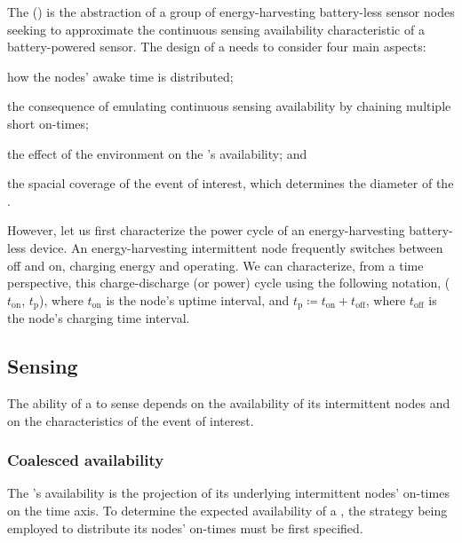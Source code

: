 The \fullcis (\cis) is the abstraction of a group of energy-harvesting battery-less sensor nodes seeking to approximate the continuous sensing availability characteristic of a battery-powered sensor. The design of a \cis needs to consider four main aspects: 
\begin{enumerate*}[label=(\roman*)]
\item how the nodes' awake time is distributed; 
\item the consequence of emulating continuous sensing availability by chaining multiple short on-times; 
\item the effect of the environment on the \cis's availability; and 
\item the spacial coverage of the event of interest, which determines the diameter of the \cis.
\end{enumerate*}

However, let us first characterize the power cycle of an energy-harvesting battery-less device. 
An energy-harvesting intermittent node frequently switches between off and on, charging energy and operating. We can characterize, from a time perspective, this charge-discharge (or power) cycle using the following notation, ($t_\text{on}$, $t_\text{p}$), where $t_\text{on}$ is the node's uptime interval, and $t_\text{p} \coloneqq t_\text{on} + t_\text{off}$, where $t_\text{off}$ is the node's charging time interval.

\subsection{Sensing}
The ability of a \cis to sense depends on the availability of its intermittent nodes and on the characteristics of the event of interest. 

\subsubsection{Coalesced availability}
\label{subSec:availability}
The \cis's availability is the projection of its underlying intermittent nodes' on-times on the time axis. 
To determine the expected availability of a \cis, the strategy being employed to distribute its nodes' on-times must be first specified.
%
